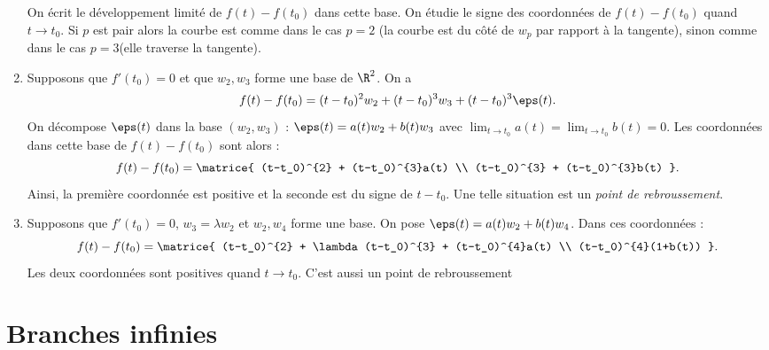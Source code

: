 \documentclass{mybourbaki}
\begin{document}
\begin{enumerate}
On écrit le développement limité de $f(t)-f(t_0)$ dans cette base. On étudie le signe des coordonnées de $f(t)-f(t_0)$ quand $t\to t_0$. Si $p$ est pair alors la courbe est comme dans le cas $p=2$ (la courbe est du côté de $w_p$ par rapport à la tangente), sinon comme dans le cas $p=3 $(elle traverse la tangente).

\item Supposons que $f'(t_0) = 0$ et que $w_2,w_3$ forme une base de $\R^{2}$. On a \[f(t) - f(t_0) = (t-t_0)^{2}w_2 + (t-t_0)^{3}w_3 + (t-t_0)^{3}\eps(t).\]
On décompose $\eps(t)$ dans la base $(w_2,w_3)$ : $\eps(t)= a(t)w_2 + b(t)w_3$ avec $\lim_{t\to t_0}a(t) = \lim_{t\to t_0}b(t) = 0$. Les coordonnées dans cette base de $f(t)-f(t_0)$ sont alors : \[ f(t)-f(t_0) = \matrice{ (t-t_0)^{2} + (t-t_0)^{3}a(t) \\ (t-t_0)^{3} + (t-t_0)^{3}b(t) }. \]
Ainsi, la première coordonnée est positive et la seconde est du signe de $t-t_0$.
Une telle situation est un \textit{point de rebroussement}.

\item Supposons que $f'(t_0) = 0$, $w_3=\lambda w_2$ et $w_2,w_4$ forme une base. On pose $\eps(t) = a(t)w_2 + b(t)w_4$. Dans ces coordonnées : \[ f(t)-f(t_0) = \matrice{ (t-t_0)^{2} + \lambda (t-t_0)^{3} + (t-t_0)^{4}a(t) \\ (t-t_0)^{4}(1+b(t)) }.\]
Les deux coordonnées sont positives quand $t\to t_0$. C'est aussi un point de rebroussement
\end{enumerate}

\section{Branches infinies}

\end{document}
